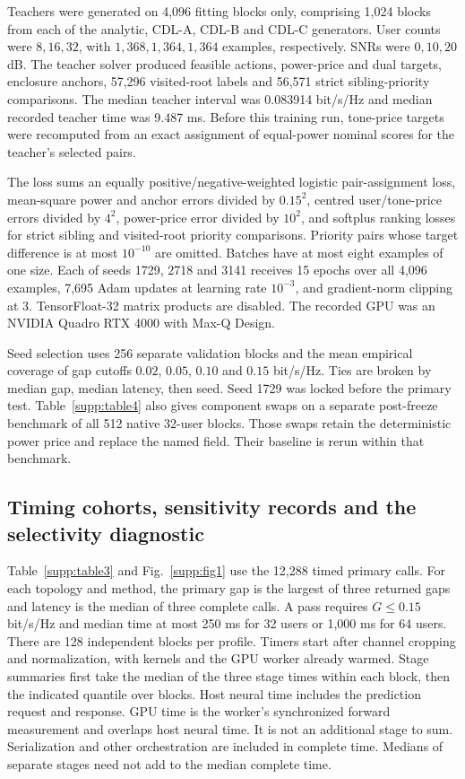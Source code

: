 \documentclass[10pt,letterpaper]{article}
\begin{document}
Teachers were generated on 4,096 fitting blocks only, comprising 1,024
blocks from each of the analytic, CDL-A, CDL-B and CDL-C generators.
User counts were \(8,16,32\), with \(1,368,1,364,1,364\) examples,
respectively. SNRs were \(0,10,20\) dB. The teacher solver produced
feasible actions, power-price and dual targets, enclosure anchors, 57,296
visited-root labels and 56,571 strict sibling-priority comparisons.
The median teacher interval was 0.083914 bit/s/Hz and median recorded
teacher time was 9.487 ms. Before this training run, tone-price targets
were recomputed from an exact assignment of equal-power nominal scores
for the teacher's selected pairs.

The loss sums an equally positive/negative-weighted logistic pair-assignment
loss, mean-square power and anchor errors divided by \(0.15^2\), centred
user/tone-price errors divided by \(4^2\), power-price error divided by
\(10^2\), and softplus ranking losses for strict sibling and visited-root
priority comparisons. Priority pairs whose target difference is at most
\(10^{-10}\) are omitted. Batches have at most eight examples of one size.
Each of seeds 1729, 2718 and 3141 receives 15 epochs over all 4,096 examples,
7,695 Adam updates at learning rate \(10^{-3}\), and gradient-norm clipping
at 3. TensorFloat-32 matrix products are disabled.
The recorded GPU was an NVIDIA Quadro RTX 4000 with Max-Q Design.

Seed selection uses 256 separate validation blocks and the mean empirical
coverage of gap cutoffs \(0.02\), \(0.05\), \(0.10\) and \(0.15\) bit/s/Hz. Ties are broken
by median gap, median latency, then seed. Seed 1729 was locked before
the primary test. Table~\ref{supp:table4} also gives component swaps on a
separate post-freeze benchmark of all 512 native 32-user blocks.
Those swaps retain the deterministic power price and replace the named
field. Their baseline is rerun within that benchmark.

\subsection{Timing cohorts, sensitivity records and the selectivity diagnostic}
Table~\ref{supp:table3} and Fig.~\ref{supp:fig1} use the 12,288 timed
primary calls. For each topology and method, the primary gap is the
largest of three returned gaps and latency is the median of three
complete calls. A pass requires \(G\le0.15\) bit/s/Hz and median time
at most 250 ms for 32 users or 1,000 ms for 64 users.
There are 128 independent blocks per profile. Timers start after channel
cropping and normalization, with kernels and the GPU worker already warmed.
Stage summaries first take
the median of the three stage times within each block, then the indicated
quantile over blocks. Host neural time includes the prediction request
and response. GPU time is the worker's synchronized forward measurement
and overlaps host neural time. It is not an additional stage to sum.
Serialization and other orchestration are included in complete time.
Medians of separate stages need not add to the median complete time.
\end{document}
